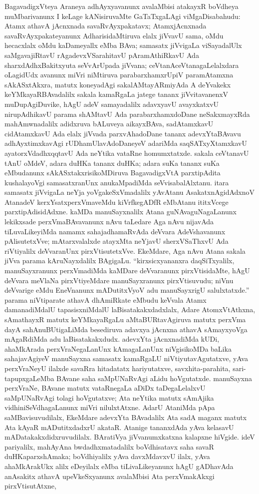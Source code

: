 BagavadigxVteya Araneya adhAyxyavanunx avalaMbisi atakayxR boVdheya muMba\-rivanunx I keLage kANisiruvaMte GaTaTxgaLAgi viMgaDisabahudu: Atamx athavA jAcnxnada savaRvAyxpakatavx; AtamxjAcnxnada savaRvAyxpakateyanunx AdharisidaMtiruva elalx jiVvavU sama, oMdu hecacxlalx oMdu kaDameyallx eMba BAva; samasatx jiVvigaLa viSaya\-dalUlx saMgavajiRtavU rAgadevxVSarahitavU pAramAthiRkavU Ada sharxdAdhxBakitxyuta seVvA\-rUpada jiVvana; ceVtanAceVtanagaLelalxdara oLagidUdx avanunx miVri niMtiruva parabarxhamxrUpiV paramAtamxna sAkASxtAkxra, matutx koneyadAgi sakalAMtayARmiyAda A deYvakekx keYMkayaRBAvadalilx sakala kamaRgaLa jatege tananx jiVvitavanenxV muDupAgiDu\-vike, hAgU adeV samayadalilx adavxyavU avayxkatxvU nirupAdhikavU parama shAMtavU Ada parabarxhamxdoDane neSakxmayxRda mahAmwnadalilx adidxruva bALuveya aikayxBAva, sadAtamxkavU cidAtamxkavU Ada elalx jiVvada parxvAhadoDane tananx adevxYtaBAvavu adhAyx\-timxkavAgi rUDhamUlavAdoDaneyeV adariMda saqSATxyXtamxkavU ayatorxVdadhxqqtavU Ada neYtika vataRne homumxtatxde. sakala ceVtanavU tAnU oMdeV, adara duHKa tananx duHKa; adara suKa tananx suKa eMbudanunx sAkASxtakxrisikoMDiruva BagavadigxVtA parxtipAdita kushalayoVgi samasatxranUnx anukaMpadiMda seVvisabalAlxtanu. itara samasatx jiVvi\-gaLa neYja yoVgakeSxVmadalilx yAvAtanu AsakatxnAgidAdxnoV AtanadeV kerxYsatxperxVmaveMdu kiVrfkegADfR eMbAtanu ititxVcege parxtipAdisidAdxne. kaMDa manuSayxnalilx Atana guNAva\-guNagaLanunx lekikxsade perxVmaBAvavanunx nAvu taLedare Aga nAvu nijavAda tiLu\-vaLikeyiMda namamx sahajadhamaRvAda deVvara AdeVshavanunx pAlisutetxVve; mAtarxvalalxde atayxMta neYjavU sherxVSaThxvU Ada riVtiyalilx deVvaranUnx pirxVtisutetxVve. EkeMdare, Aga nAvu Atana sakala jiVva parama kAruNayxdalilx BAgigaLu. ``kirxsicxyananxra daqSiTxyalilx, manu\-Sayxranunx perxVmadiMda kaMDare deVvaranunx pirxVtisidaMte, hAgU deVvara meVlaNa pirxVtiyeMdare manuSayxranunx pirxVtisuvudu; niVnu deVvarige eMdu EneVnanunx mADutitxVyoV adu manuSayxrigU salulxtatxde.'' parama niVtiparate athavA dhAmiRkate eMbudu keVvala Atamx damanadiMdalU tapasisxniMdalU laBisatakakxdadxlalx, Adare AtomxVtAthxna, \hbox{sAmathayxR} matutx keYMkayaRgaLu aMtaBURtavAgiruva matutx perxVma dayA sahAnuBUti\-gaLiMda besediruva adavxya jAcnxna athavA sAmayxyoVga mAgaRdiMda adu laBisa\-takakxdudx. adevxYta jAcnxnadiMda kUDi, ahaMkArada perxVraNegaLanUnx kAmagaLanUnx niVgisi\-koMDa baLika sahajavAgiyeV manuSayxna samasatx kamaRgaLU niVtiyutavAgutatxve, yAva perxVraNeyU ilalxde savaRra hitadatatx hariyutatxve, savxhita-parahita, sari-tapupx\-gaLeMba BAvane saha saMpUNaRvAgi aLidu hoVgutatxde. manuSayxna perxVraNe, BAvane matutx vataRnegaLa aDiDx taDegaLelalxvU saMpUNaRvAgi tolagi hoVgutatxve; Ata neYtika matutx sAmAjika vidhiniSeVdhagaLanunx miVri nilulxtAtxne. AdarU AtaniMda pApa saMBavisuvudilalx, EkeMdare adevxYta BAvadalilx Ata sadA maganx matutx Ata kAyaR mADutitxdadxrU akataR. Atanige tananxdAda yAva kelasavU mADatakakxdidxruvudilalx. BAra\-tiVya jiVvanumxkatxna kalapxne hiVgide. ideV pariyalilx, mahAyAna bwdadhxmatadalilx boVdhisatavx saha savaR duHKaparxshAmaka; boVdhiyalilx yAva davxMdavxvU ilalx, yAva ahaMkArakUkx alilx eDeyilalx eMba tiLivaLikeyanunx hAgU gADhavAda anAsakitx athavA upeVkeSxyanunx avalaMbisi Ata perxVmakAkxgi pirxVtisutAtxne, 